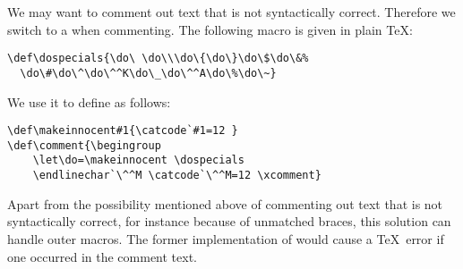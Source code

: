 \documentclass[letterpaper]{book}
\begin{document}
We may want to comment out text that is not syntactically
correct. Therefore we switch to a
when commenting. The following macro is given 
in plain \TeX:
\begin{verbatim}
\def\dospecials{\do\ \do\\\do\{\do\}\do\$\do\&%
  \do\#\do\^\do\^^K\do\_\do\^^A\do\%\do\~}
\end{verbatim}
We use it to define  as follows:
\begin{verbatim}
\def\makeinnocent#1{\catcode`#1=12 }
\def\comment{\begingroup
    \let\do=\makeinnocent \dospecials
    \endlinechar`\^^M \catcode`\^^M=12 \xcomment}
\end{verbatim}
Apart from the possibility mentioned above of commenting
out text that is not syntactically correct, for instance
because of unmatched braces, this solution can handle
outer macros. The former implementation of 
would cause a \TeX\ error if one occurred in the comment text.
\end{document}

